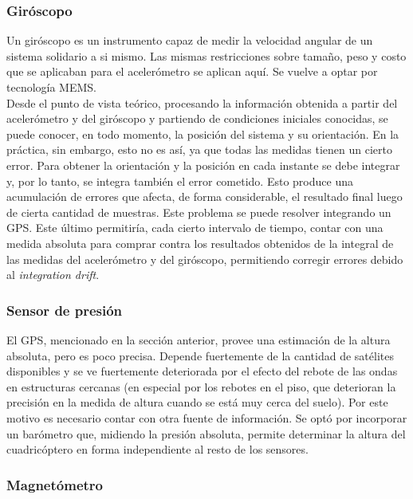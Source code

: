 \documentclass[main]{subfiles}
\begin{document}
 
\subsubsection{Gir\'oscopo}
\label{giro}

Un gir\'oscopo es un instrumento capaz de medir la velocidad angular de un sistema solidario a si mismo. Las mismas restricciones sobre tama\~no, peso y costo que se aplicaban para el aceler\'ometro se aplican aqu\'i. Se vuelve a optar por tecnolog\'ia MEMS.\\ 

Desde el punto de vista te\'orico, procesando la informaci\'on obtenida a partir del aceler\'ometro y del gir\'oscopo y partiendo de condiciones iniciales conocidas, se puede conocer, en todo momento, la posici\'on del sistema y su orientaci\'on. En la pr\'actica, sin embargo, esto no es as\'i, ya que todas las medidas tienen un cierto error. Para obtener la orientaci\'on y la posici\'on en cada instante se debe integrar y, por lo tanto, se integra tambi\'en el error cometido. Esto produce una acumulaci\'on de errores que afecta, de forma considerable, el resultado final luego de cierta cantidad de muestras. Este problema se puede resolver integrando un GPS. Este \'ultimo permitir\'ia, cada cierto intervalo de tiempo, contar con una medida absoluta para comprar contra los resultados obtenidos de la integral de las medidas del aceler\'ometro y del gir\'oscopo, permitiendo corregir errores debido al \emph{integration drift}.

\subsubsection{Sensor de presi\'on}

El GPS, mencionado en la secci\'on anterior, provee una estimaci\'on de la altura absoluta, pero es poco precisa. Depende fuertemente de la cantidad de sat\'elites disponibles y se ve fuertemente deteriorada por el efecto del rebote de las ondas en estructuras cercanas (en especial por los rebotes en el piso, que deterioran la precisi\'on en la medida de altura cuando se est\'a muy cerca del suelo). Por este motivo es necesario contar con otra fuente de informaci\'on. Se opt\'o por incorporar un bar\'ometro que, midiendo la presi\'on absoluta, permite determinar la altura del cuadric\'optero en forma independiente al resto de los sensores.

\subsubsection{Magnet\'ometro}
\end{document}
